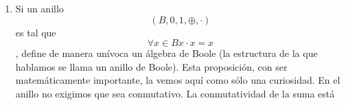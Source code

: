 \begin{enumerate}
\begin{enumerate}
\begin{enumerate}
\begin{enumerate}
        \begin{enumerate}
        \def\labelenumv{\arabic{enumv}.}
        \tightlist
        \item
          Prueba:
        \item
          \[{({a \odot b})} \odot {{({a + b})} =}\]
        \item
          \[{= {({{({\overline{a} + b})} \cdot {({a \cdot \overline{b}})}})}} \odot {{({a + b})} =}\]
        \item
          \[{= {{\lbrack{\overline{({{({\overline{a}+b})}\cdot{({a+\overline{b}})}})} + {({a + b})}}\rbrack} \cdot {\lbrack{{({{({\overline{a} + b})} \cdot {({a + \overline{b}})}})} + \overline{({a+b})}}\rbrack}}} =\]
        \item
          \[{= {{\lbrack{{({\overline{({\overline{a}+b})} + \overline{({a+\overline{b}})}})} + {({a + b})}}\rbrack} \cdot {\lbrack{{({{({\overline{a} + b})} \cdot {({a + \overline{b}})}})} + {({\overline{a} \cdot \overline{b}})}}\rbrack}}} =\]
        \item
          \[{= {{\lbrack{{({{({a + \overline{b}})} \cdot {({\overline{a} + b})}})} \cdot {({a \cdot b})}}\rbrack} + {\lbrack{{({{({\overline{a} \cdot b})} + {({a \cdot \overline{b}})}})} \cdot {({\overline{a} + \overline{b}})}}\rbrack}}} =\]
        \item
          \[{= {{\lbrack{({a + b})}\rbrack} \cdot {\lbrack{({{({\overline{a} + b})} \cdot {({a + \overline{b}})}})}\rbrack}}} =\]
        \item
          \[{= {{{({a + b})} \cdot {({\overline{a} + b})}} \cdot {({a + \overline{b}})}}} =\]
        \item
          \[{= {{\lbrack{{({a + b})} \cdot {({\overline{a} + b})}}\rbrack} \cdot {\lbrack{{({a + b})} \cdot {({a + \overline{b}})}}\rbrack}}} =\]
        \item
          \[{= {{\lbrack b\rbrack} \cdot {\lbrack a\rbrack}}} =\]
        \item
          \[= {a \cdot b}\]
        \end{enumerate}
      \end{enumerate}
    \item
      Si un anillo \[({B,0,1, \oplus , \cdot})\] es tal que
      \[\forall{x \in B}{{x \cdot x} = x}\], define de manera unívoca un
      álgebra de Boole (la estructura de la que hablamos se llama un
      anillo de Boole). Esta proposición, con ser matemáticamente
      importante, la vemos aquí como sólo una curiosidad. En el anillo
      no exigimos que sea conmutativo. La conmutatividad de la suma está

\end{enumerate}
\end{enumerate}
\end{enumerate}
